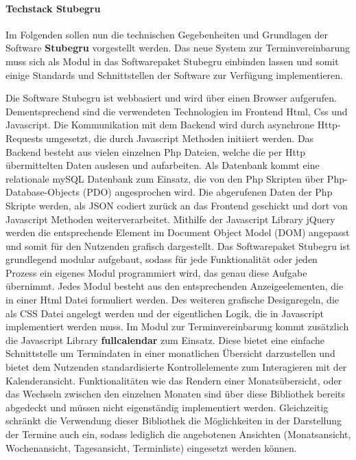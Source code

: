 \documentclass[12pt]{article}
\begin{document}
\paragraph{Techstack Stubegru}
Im Folgenden sollen nun die technischen Gegebenheiten und Grundlagen der
Software \textbf{Stubegru} vorgestellt werden. Das neue System zur
Terminvereinbarung muss sich als Modul in das Softwarepaket Stubegru einbinden
lassen und somit einige Standards und Schnittstellen der Software zur Verfügung
implementieren.

Die Software Stubegru ist webbasiert und wird über einen Browser aufgerufen.
Dementsprechend sind die verwendeten Technologien im Frontend Html, Css und
Javascript. Die Kommunikation mit dem Backend wird durch asynchrone
Http-Requests umgesetzt, die durch Javascript Methoden initiiert werden. Das
Backend besteht aus vielen einzelnen Php Dateien, welche die per Http
übermittelten Daten auslesen und aufarbeiten. Als Datenbank kommt eine
relationale mySQL Datenbank zum Einsatz, die von den Php Skripten über
Php-Database-Objects (PDO) angesprochen wird. Die abgerufenen Daten der Php
Skripte werden, als JSON codiert zurück an das Frontend geschickt und dort von
Javascript Methoden weiterverarbeitet. Mithilfe der Javascript Library jQuery
werden die entsprechende Element im Document Object Model (DOM) angepasst und
somit für den Nutzenden grafisch dargestellt. Das Softwarepaket Stubegru ist
grundlegend modular aufgebaut, sodass für jede Funktionalität oder jeden
Prozess ein eigenes Modul programmiert wird, das genau diese Aufgabe übernimmt.
Jedes Modul besteht aus den entsprechenden Anzeigeelementen, die in einer
Html Datei formuliert werden. Des weiteren grafische Designregeln, die als CSS
Datei angelegt werden und der eigentlichen Logik, die in Javascript
implementiert werden muss. Im Modul zur Terminvereinbarung kommt zusätzlich die
Javascript Library \textbf{fullcalendar} zum Einsatz. Diese bietet eine
einfache Schnittstelle um Termindaten in einer monatlichen Übersicht
darzustellen und bietet dem Nutzenden standardisierte Kontrollelemente zum
Interagieren mit der Kalenderansicht. Funktionalitäten wie das Rendern einer
Monatsübersicht, oder das Wechseln zwischen den einzelnen Monaten sind über diese
Bibliothek bereits abgedeckt und müssen nicht eigenständig implementiert
werden. Gleichzeitig schränkt die Verwendung dieser Bibliothek die
Möglichkeiten in der Darstellung der Termine auch ein, sodass lediglich die
angebotenen Ansichten (Monatsansicht, Wochenansicht, Tagesansicht, Terminliste)
eingesetzt werden können.
\end{document}
